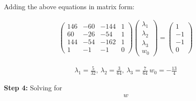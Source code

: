 \documentclass[12pt]{report}
\begin{document}
Adding the above equations in matrix form:

\begin{equation*}
	\begin{aligned}
		\begin{pmatrix}146 & -60 & -144 & 1 \\ 60&-26&-54&1\\ 144&-54&-162&1\\ 1&-1&-1&0\end{pmatrix}\begin{pmatrix}\lambda_{1}\\ \lambda_{2}\\ \lambda_{3}\\ w_{0}\end{pmatrix}=\begin{pmatrix}1\\ -1\\ -1\\ 0\end{pmatrix}
	\end{aligned}
\end{equation*}

\begin{equation*}
	\begin{aligned}
		\lambda_{1}=\frac{5}{32},\:\lambda_{2}=\frac{3}{64},\:\lambda_{3}=\frac{7}{64}\:w_{0}=-\frac{13}{4}
	\end{aligned}
\end{equation*}

\vspace{20pt}

\textbf{Step 4:} Solving for \begin{equation*}
	\begin{aligned}
		w
	\end{aligned}
\end{equation*}
\end{document}
